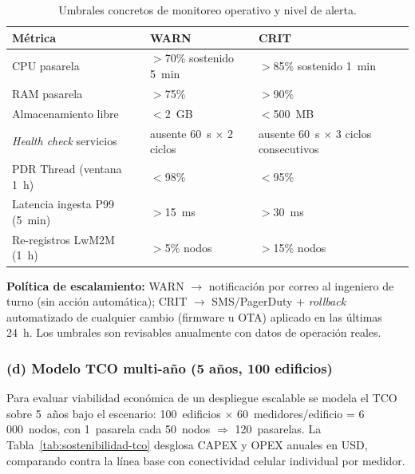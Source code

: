 \begin{table}[h]
\centering
\caption{Umbrales concretos de monitoreo operativo y nivel de alerta.}
\label{tab:sostenibilidad-monitoreo}
\begin{tabular}{|p{3.2cm}|p{4.0cm}|p{4.0cm}|}
\hline
\textbf{Métrica} & \textbf{WARN} & \textbf{CRIT} \\
\hline
CPU pasarela & $>$70\% sostenido 5~min & $>$85\% sostenido 1~min \\
\hline
RAM pasarela & $>$75\% & $>$90\% \\
\hline
Almacenamiento libre & $<$2~GB & $<$500~MB \\
\hline
\emph{Health check} servicios & ausente 60~s $\times$ 2 ciclos & ausente 60~s $\times$ 3 ciclos consecutivos \\
\hline
PDR Thread (ventana 1~h) & $<$98\% & $<$95\% \\
\hline
Latencia ingesta P99 (5~min) & $>$15~ms & $>$30~ms \\
\hline
Re-registros LwM2M (1~h) & $>$5\% nodos & $>$15\% nodos \\
\hline
\end{tabular}
\end{table}

\textbf{Política de escalamiento:} WARN $\rightarrow$ notificación por correo al ingeniero de turno (sin acción automática); CRIT $\rightarrow$ SMS/PagerDuty + \emph{rollback} automatizado de cualquier cambio (firmware u OTA) aplicado en las últimas 24~h. Los umbrales son revisables anualmente con datos de operación reales.

\subsubsection{(d) Modelo TCO multi-año (5 años, 100 edificios)}

Para evaluar viabilidad económica de un despliegue escalable se modela el TCO sobre 5~años bajo el escenario: 100~edificios $\times$ 60~medidores/edificio = 6\,000~nodos, con 1~pasarela cada 50~nodos $\Rightarrow$ 120~pasarelas. La Tabla~\ref{tab:sostenibilidad-tco} desglosa CAPEX y OPEX anuales en USD, comparando contra la línea base con conectividad celular individual por medidor.

